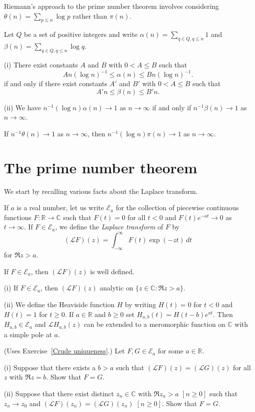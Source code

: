 Riemann's approach to the prime number theorem involves
considering $\theta(n)=\sum_{p\leq n}\log p$ rather than
$\pi(n)$.
\begin{lemma} Let $Q$ be a set of positive integers
and write $\alpha(n)=\sum_{q\in Q,q\leq n} 1$
and $\beta(n)=\sum_{q\in Q,q\leq n} \log q$.

(i) There exist constants $A$ and $B$
with $0<A\leq B$ such that
\[An(\log n)^{-1}\leq\alpha(n)\leq Bn(\log n)^{-1}.\]
if and only if there exist constants $A'$ and $B'$
with $0<A\leq B$ such that
\[A'n\leq\beta(n)\leq B'n.\]

(ii) We have $n^{-1}(\log n)\alpha(n)\rightarrow 1$
as $n\rightarrow\infty$
if and only if $n^{-1}\beta(n)\rightarrow 1$
as $n\rightarrow\infty$.
\end{lemma}
\begin{lemma}\label{logarithm transfer}
If $n^{-1}\theta(n)\rightarrow 1$
as $n\rightarrow\infty$, then
$n^{-1}(\log n)\pi(n)\rightarrow 1$
as $n\rightarrow\infty$.
\end{lemma}
\section{The prime number theorem}\label{S;prime number}
We start by recalling various
facts about the Laplace transform.
\begin{definition}
If $a$ is a real number,
let us write ${\mathcal E}_{a}$  for the collection
of piecewise continuous
functions $F:{\mathbb R}\rightarrow{\mathbb C}$
such that $F(t)=0$ for all $t<0$ and
$F(t)e^{-at}\rightarrow 0$ as $t\rightarrow\infty$.
If $F\in {\mathcal E}_{a}$, we define the
\emph{Laplace transform} of $F$ by
\[({\mathcal L}F)(z)=\int_{-\infty}^{\infty}F(t)\exp(-zt)\,dt\]
for $\Re z>a$.
\end{definition}
\begin{lemma} If $F\in {\mathcal E}_{a}$, then
$({\mathcal L}F)(z)$ is well defined.
\end{lemma}


\begin{lemma}\label{Laplace}
(i) If $F\in {\mathcal E}_{a}$, then
$({\mathcal L}F)(z)$
analytic on $\{z\in{\mathbb C}:\Re z>a\}$.

(ii) We  define the Heaviside function $H$ by
writing $H(t)=0$ for $t<0$ and $H(t)=1$ for $t\geq 0$.
If $a\in {\mathbb R}$ and $b\geq 0$ set
$H_{a,b}(t)=H(t-b)e^{at}$. Then $H_{a,b}\in {\mathcal E}_{a}$
and ${\mathcal L}H_{a,b}(z)$ can be extended
to a meromorphic function on ${\mathbb C}$ with a simple
pole at $a$.
\end{lemma}
\begin{exercise} (Uses Exercise~\ref{Crude uniqueness}.)
Let $F,G\in {\mathcal E}_{a}$ for some $a\in{\mathbb R}$.

(i) Suppose that there exists a $b>a$ such
that $({\mathcal L}F)(z)=({\mathcal L}G)(z)$ for
all $z$ with $\Re z=b$. Show that $F=G$.

(ii) Suppose that there exist distinct $z_{n}\in{\mathbb C}$
with $\Re z_{n}>a$ $[n\geq 0]$ such that $z_{n}\rightarrow z_{0}$
and $({\mathcal L}F)(z_{n})=({\mathcal L}G)(z_{n})$
$[n\geq 0]$. Show that $F=G$.
\end{exercise}

